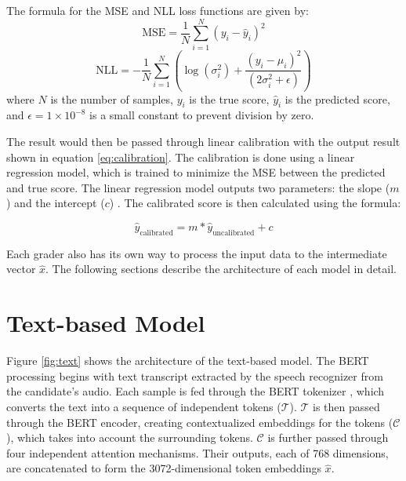 The formula for the MSE and NLL loss functions are given by:
\begin{equation}
    \text{MSE} = \frac{1}{N} \sum_{i=1}^{N} (y_i - \hat{y}_i)^2
\end{equation}
\begin{equation}
    \text{NLL} = -\frac{1}{N} \sum_{i=1}^{N} \left( \log(\sigma_i^2) + \frac{(y_i - \mu_i)^2}{(2\sigma_i^2 + \epsilon)} \right)
\end{equation}
where $N$ is the number of samples, $y_i$ is the true score,  $\hat{y}_i$ is the predicted score, and $\epsilon = 1\times10^{-8}$ is a small constant to prevent division by zero.

The result would then be passed through linear calibration with the output result shown in equation \ref{eq:calibration}. The calibration is done using a linear regression model, which is trained to minimize the MSE between the predicted and true score. The linear regression model outputs two parameters: the slope ($m$)  and the intercept ($c$) . The calibrated score is then calculated using the formula:

\begin{equation}
    \hat{y}_{\text{calibrated}} = m*\hat{y}_{\text{uncalibrated}} + c
    \label{eq:calibration}
\end{equation}

Each grader also has its own way to process the input data to the intermediate vector $\hat{x}$. The following sections describe the architecture of each model in detail.

\section{Text-based Model}
Figure \ref{fig:text} shows the architecture of the text-based model. The BERT processing begins with text transcript extracted by the speech recognizer from the candidate's audio. Each sample is fed through the BERT tokenizer , which converts the text into a sequence of independent tokens ($\mathcal{T}$). $\mathcal{T}$ is then passed through the BERT encoder, creating contextualized embeddings for the tokens ($\mathcal{C}$), which takes into account the surrounding tokens. $\mathcal{C}$ is further passed through four independent attention mechanisms. Their outputs, each of 768 dimensions, are concatenated to form the 3072-dimensional token embeddings $\hat{x}$.

